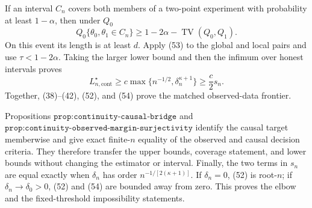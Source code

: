 If an interval \(C_n\) covers both members of a two-point experiment with probability at least \(1-\alpha\), then under \(Q_0\)
\[
 Q_0\{\theta_0,\theta_1\in C_n\}
 \geq1-2\alpha-\operatorname{TV}(Q_0,Q_1). \tag{53}
\]
On this event its length is at least \(d\).  Apply (53) to the global and local pairs and use \(\tau<1-2\alpha\).  Taking the larger lower bound and then the infimum over honest intervals proves
\[
 L_{n,\mathrm{cont}}^\star\geq c\max\{n^{-1/2},\delta_n^{\kappa+1}\}\geq\frac c2s_n. \tag{54}
\]
Together, (38)--(42), (52), and (54) prove the matched observed-data frontier.

Propositions \(\texttt{prop:continuity-causal-bridge}\) and \(\texttt{prop:continuity-observed-margin-surjectivity}\) identify the causal target memberwise and give exact finite-\(n\) equality of the observed and causal decision criteria.  They therefore transfer the upper bounds, coverage statement, and lower bounds without changing the estimator or interval.  Finally, the two terms in \(s_n\) are equal exactly when \(\delta_n\) has order \(n^{-1/[2(\kappa+1)]}\).  If \(\delta_n=0\), (52) is root-\(n\); if \(\delta_n\to\delta_0>0\), (52) and (54) are bounded away from zero.  This proves the elbow and the fixed-threshold impossibility statements.